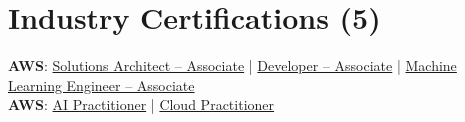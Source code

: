 \providecommand{\variantCertExtra}{}
\section{\textbf{Industry Certifications (5)}}
\vspace{-2pt}
\begin{itemize}[leftmargin=0.05in, label={}]
    \small{\item{
     \textbf{AWS}{: \href{https://www.credly.com/badges/591e74ef-f6a8-4b77-82dc-07e06fb8060e}{Solutions Architect -- Associate} | \href{https://www.credly.com/badges/be7f9e0a-593a-4544-8dfd-f69f669ec57d}{Developer -- Associate} | \href{https://www.credly.com/badges/d6dc337a-0af5-48f8-b64f-eb2a5925f07b}{Machine Learning Engineer -- Associate}} \\
     \textbf{AWS}{: \href{https://www.credly.com/badges/e18d2154-e153-40b3-8f39-6684e561396e}{AI Practitioner} | \href{https://www.credly.com/badges/bf8ffb47-284c-4c45-adb8-3df4f807e404}{Cloud Practitioner}}\variantCertExtra
    }}
\end{itemize}
\vspace{-2mm}
